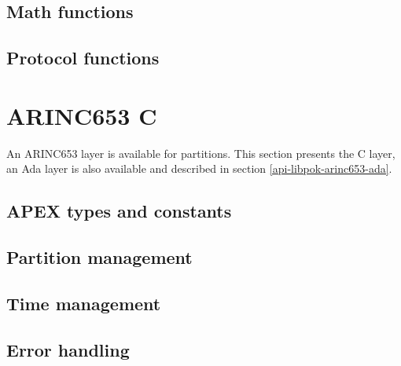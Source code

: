    \subsection{Math functions}

   

   \subsection{Protocol functions}
   
   
   
   

   \section{ARINC653 C}
   \label{api-libpok-arinc653-c}
   An ARINC653 layer is available for partitions. This section presents the C
   layer, an Ada layer is also available and described in section
   \ref{api-libpok-arinc653-ada}.

   \subsection{APEX types and constants}
   

   \subsection{Partition management}
   

   \subsection{Time management}
   

   \subsection{Error handling}
   

